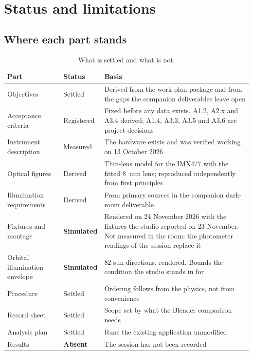 \chapter*{Status and limitations}

\section*{Where each part stands}

\begin{table}[htbp]
\centering
\caption[Status of this document]{What is settled and what is not.}
\label{tab:status}
\begin{tabularx}{\textwidth}{@{}l l X@{}}
\toprule
\textbf{Part} & \textbf{Status} & \textbf{Basis} \\
\midrule
Objectives & Settled & Derived from the work plan package and from the gaps
             the companion deliverables leave open \\
Acceptance criteria & Registered & Fixed before any data exists. A1.2, A2.x
             and A3.4 derived; A1.4, A3.3, A3.5 and A3.6 are project
             decisions \\
Instrument description & Measured & The hardware exists and was verified
             working on 13 October 2026 \\
Optical figures & Derived & Thin-lens model for the IMX477 with the fitted
             8~mm lens; reproduced independently from first principles \\
Illumination requirements & Derived & From primary sources in the companion
             dark-room deliverable \\
Fixtures and montage & \textbf{Simulated} & Rendered on 24 November 2026
             with the fixtures the studio reported on 23 November. Not
             measured in the room: the photometer readings of the session
             replace it \\
Orbital illumination envelope & \textbf{Simulated} & 82 sun directions,
             rendered. Bounds the condition the studio stands in for \\
Procedure & Settled & Ordering follows from the physics, not from
             convenience \\
Record sheet & Settled & Scope set by what the Blender comparison needs \\
Analysis plan & Settled & Runs the existing application unmodified \\
Results & \textbf{Absent} & The session has not been recorded \\
\bottomrule
\end{tabularx}
\end{table}

